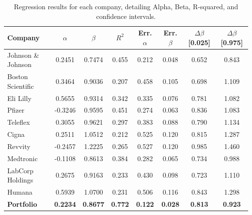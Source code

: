 \begin{table}[htbp]
    \centering
    \footnotesize
    \renewcommand{\arraystretch}{1.2} %
    \begin{tabular}{|l|c|c|c|c|c|c|c|}
        \hline
        \rowcolor{unired!30} \textbf{Company} & \textbf{$\alpha$} & \textbf{$\beta$} & \textbf{$R^2$} & \textbf{Err. $\alpha$} & \textbf{Err. $\beta$} & \textbf{$\Delta \beta$ [0.025]} & \textbf{$\Delta \beta$ [0.975]} \\ \hline
        Johnson \& Johnson & 0.2451 & 0.7474 & 0.455 & 0.212 & 0.048 & 0.652 & 0.843 \\ \hline
        \rowcolor{gray!10} Boston Scientific & 0.3464 & 0.9036 & 0.207 & 0.458 & 0.105 & 0.698 & 1.109 \\ \hline
        Eli Lilly & 0.5655 & 0.9314 & 0.342 & 0.335 & 0.076 & 0.781 & 1.082 \\ \hline
        \rowcolor{gray!10} Pfizer & -0.3246 & 0.9595 & 0.451 & 0.274 & 0.063 & 0.836 & 1.083 \\ \hline
        Teleflex & 0.3055 & 0.9621 & 0.297 & 0.383 & 0.088 & 0.790 & 1.134 \\ \hline
        \rowcolor{gray!10} Cigna & 0.2511 & 1.0512 & 0.212 & 0.525 & 0.120 & 0.815 & 1.287 \\ \hline
        Revvity & -0.2457 & 1.2225 & 0.265 & 0.527 & 0.120 & 0.985 & 1.460 \\ \hline
        \rowcolor{gray!10} Medtronic & -0.1108 & 0.8613 & 0.384 & 0.282 & 0.065 & 0.734 & 0.988 \\ \hline
        LabCorp Holdings & 0.2675 & 0.9163 & 0.233 & 0.430 & 0.098 & 0.723 & 1.110 \\ \hline
        \rowcolor{gray!10} Humana & 0.5939 & 1.0700 & 0.231 & 0.506 & 0.116 & 0.843 & 1.298 \\ \Xhline{1.2\arrayrulewidth}

        \textbf{Portfolio} & \textbf{0.2234} & \textbf{0.8677} & \textbf{0.772} & \textbf{0.122} & \textbf{0.028} & \textbf{0.813 } & \textbf{0.923} \\ \hline
    \end{tabular}
    \caption{Regression results for each company, detailing Alpha, Beta, R-squared, and confidence intervals.}
    \label{tab:regression_results}
\end{table}

